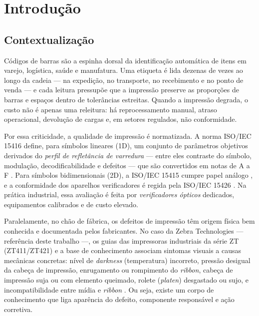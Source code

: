 \documentclass[
	article,			%
	11pt,				%
	oneside,			%
	a4paper,			%
	english,			%
	brazilian,			%
	sumario=tradicional
	]{abntex2}
\begin{document}
\section{Introdução}

\subsection{Contextualização}

Códigos de barras são a espinha dorsal da identificação automática de itens em
varejo, logística, saúde e manufatura. Uma etiqueta é lida dezenas de vezes ao
longo da cadeia --- na expedição, no transporte, no recebimento e no ponto de
venda --- e cada leitura pressupõe que a impressão preserve as proporções de
barras e espaços dentro de tolerâncias estreitas. Quando a impressão degrada, o
custo não é apenas uma releitura: há reprocessamento manual, atraso operacional,
devolução de cargas e, em setores regulados, não conformidade.

Por essa criticidade, a qualidade de impressão é normatizada. A norma ISO/IEC
15416 define, para símbolos lineares (1D), um conjunto de parâmetros objetivos
derivados do \textit{perfil de refletância de varredura} --- entre eles contraste
do símbolo, modulação, decodificabilidade e defeitos --- que são convertidos em
notas de A a F \cite{iso15416}. Para símbolos bidimensionais (2D), a ISO/IEC
15415 cumpre papel análogo \cite{iso15415}, e a conformidade dos aparelhos
verificadores é regida pela ISO/IEC 15426 \cite{iso15426}. Na prática industrial,
essa avaliação é feita por \textit{verificadores ópticos} dedicados, equipamentos
calibrados e de custo elevado.

Paralelamente, no chão de fábrica, os defeitos de impressão têm origem física bem
conhecida e documentada pelos fabricantes. No caso da Zebra Technologies ---
referência deste trabalho ---, os guias das impressoras industriais da série ZT
(ZT411/ZT421) e a base de conhecimento associam sintomas visuais a causas
mecânicas concretas: nível de \textit{darkness} (temperatura) incorreto, pressão
desigual da cabeça de impressão, enrugamento ou rompimento do \textit{ribbon},
cabeça de impressão suja ou com elemento queimado, rolete (\textit{platen})
desgastado ou sujo, e incompatibilidade entre mídia e \textit{ribbon}
\cite{zebra_printquality}. Ou seja, existe um corpo de conhecimento que liga
aparência do defeito, componente responsável e ação corretiva.
\end{document}
